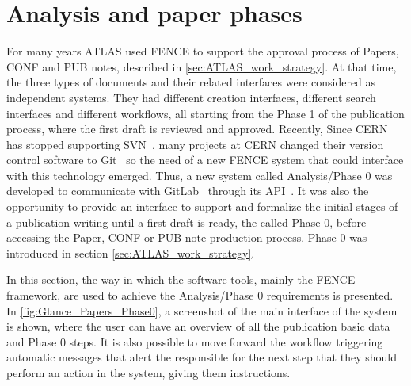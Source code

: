 
\section{Analysis and paper phases}%
\label{sec:Analysis_and_paper_phases}

For many years ATLAS used FENCE to support the approval process of Papers, CONF and PUB notes, described in \cref{sec:ATLAS_work_strategy}.
At that time, the three types of documents and their related interfaces were considered as independent systems.
They had different creation interfaces, different search interfaces and different workflows, all starting from the Phase 1 of the publication process, where the first draft is reviewed and approved.
Recently, Since CERN has stopped supporting SVN~\cite{svn}, many projects at CERN changed their version control software to Git~\cite{git} so the need of a new FENCE system that could interface with this technology emerged.
Thus, a new system called Analysis/Phase 0 was developed to communicate with GitLab~\cite{gitlab} through its API~\cite{rest_api}. It was also the opportunity to provide an interface to support and formalize the initial stages of a publication writing until a first draft is ready, the called Phase 0, before accessing the Paper, CONF or PUB note production process. Phase 0 was introduced in section \cref{sec:ATLAS_work_strategy}.

In this section, the way in which the software tools, mainly the FENCE framework, are used to achieve the Analysis/Phase 0 requirements is presented.
In \cref{fig:Glance_Papers_Phase0}, a screenshot of the main interface of the system is shown, where the user can have an overview of all the publication basic data and Phase 0 steps.
It is also possible to move forward the workflow triggering automatic messages that alert the responsible for the next step that they should perform an action in the system, giving them instructions.

